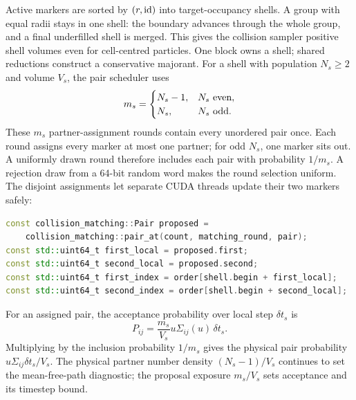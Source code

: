 Active markers are sorted by \((r,{\rm id})\) into target-occupancy shells.
A group with equal radii stays in one shell: the boundary advances through
the whole group, and a final underfilled shell is merged. This gives the
collision sampler positive shell volumes even for cell-centred particles.
One block owns a shell; shared reductions construct a conservative majorant.
For a shell with population \(N_s\ge2\) and volume \(V_s\), the pair
scheduler uses
\begin{equation}
 m_s=\begin{cases}N_s-1,&N_s\ \hbox{even},\\
                   N_s,&N_s\ \hbox{odd}.
       \end{cases}
\end{equation}
These \(m_s\) partner-assignment rounds contain every unordered pair once.
Each round assigns every marker at most one partner; for odd \(N_s\), one
marker sits out.  A uniformly drawn round therefore includes each pair with
probability \(1/m_s\).  A rejection draw from a 64-bit random word makes the
round selection uniform.  The disjoint assignments let separate CUDA
threads update their two markers safely:
\par\noindent\begin{minipage}{\linewidth}
\begin{lstlisting}[language=C++]
const collision_matching::Pair proposed =
    collision_matching::pair_at(count, matching_round, pair);
const std::uint64_t first_local = proposed.first;
const std::uint64_t second_local = proposed.second;
const std::uint64_t first_index = order[shell.begin + first_local];
const std::uint64_t second_index = order[shell.begin + second_local];
\end{lstlisting}
\end{minipage}
For an assigned pair, the acceptance probability over local step
\(\delta t_s\) is
\begin{equation}
 P_{ij}=\frac{m_s}{V_s}u\Sigma_{ij}(u)\,\delta t_s.
\end{equation}
Multiplying by the inclusion probability \(1/m_s\) gives the physical
pair probability \(u\Sigma_{ij}\delta t_s/V_s\).  The physical partner
number density \((N_s-1)/V_s\) continues to set the mean-free-path diagnostic;
the proposal exposure \(m_s/V_s\) sets acceptance and its timestep bound.
